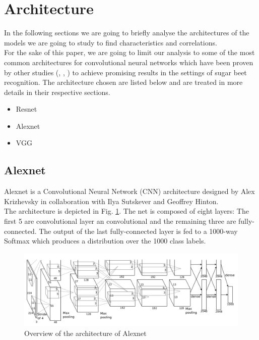 \section{Architecture}\label{sec:arch}
In the following sections we are going to briefly analyse the architectures of the models we are going to study to find characteristics and correlations. \\
For the sake of this paper, we are going to limit our analysis to some of the most common architectures for convolutional neural networks which have been proven by other studies (\cite{suh_transfer_2018}, \cite{s20205893}, \cite{phdthesis}) to achieve promising results in the settings of sugar beet recognition. The architecture chosen are listed below and are treated in more details in their respective sections. 
\begin{itemize}
\item Resnet
\item Alexnet
\item VGG
\end{itemize}
\subsection{Alexnet}
Alexnet is a Convolutional Neural Network (CNN) architecture designed by  Alex Krizhevsky in collaboration with Ilya Sutskever and Geoffrey Hinton. \cite{NIPS2012_c399862d}\\
The architecture is depicted in Fig. \ref{fig:alexnet_architecture}. The net is composed of eight layers:
The first 5 are convolutional layer an convolutional and the remaining three are fully- connected. The output of the last fully-connected layer is fed to a 1000-way Softmax which produces a distribution over the 1000 class labels. \cite{NIPS2012_c399862d}\\
\begin{figure}[htb]
    \centering
    \includegraphics[scale = 0.4]{img/alexnet_architecture.png}
    \caption[Overview of the architecture of Alexnet]{Overview of the architecture of Alexnet \cite{NIPS2012_c399862d}}
    \label{fig:alexnet_architecture}
\end{figure}


